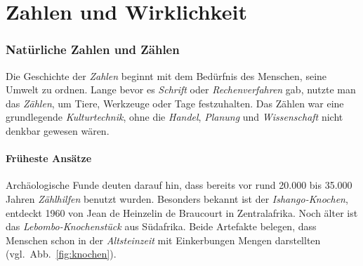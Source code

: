 \chapter{Zahlen und Wirklichkeit}
\label{chap:II_zahlen}
\label{chap:II_grundlagen}
\setcounter{section}{2}
\setcounter{subsection}{0}
\setcounter{secnumdepth}{3}


\subsection{Natürliche Zahlen und Zählen}
\label{sec:2.1_natuerliche_zahlen}

Die Geschichte der \emph{Zahlen} beginnt mit dem Bedürfnis des Menschen, 
seine Umwelt zu ordnen. 
Lange bevor es \emph{Schrift} oder 
\emph{Rechenverfahren} gab, 
nutzte man das \emph{Zählen}, um Tiere, Werkzeuge oder Tage festzuhalten. 
Das Zählen war eine grundlegende \emph{Kulturtechnik}, 
ohne die \emph{Handel}, 
\emph{Planung} und 
\emph{Wissenschaft} 
nicht denkbar gewesen wären.

\subsubsection*{Früheste Ansätze}
Archäologische Funde deuten darauf hin, dass bereits vor 
rund 20.000 bis 35.000 Jahren \emph{Zählhilfen} benutzt wurden. 
Besonders bekannt ist der \emph{Ishango-Knochen}, 
entdeckt 1960 von Jean de Heinzelin de Braucourt 
in Zentralafrika. 
Noch älter ist das \emph{Lebombo-Knochenstück} 
aus Südafrika. Beide Artefakte belegen, dass Menschen schon in der 
\emph{Altsteinzeit} 
mit Einkerbungen Mengen darstellten (vgl.~Abb.~\ref{fig:knochen}). 

